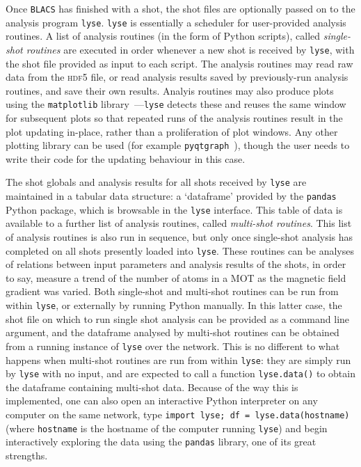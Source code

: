 Once \texttt{BLACS} has finished with a shot, the shot files are optionally passed on to the analysis program \texttt{lyse}. \texttt{lyse} is essentially a scheduler for user-provided analysis routines. A list of analysis routines (in the form of Python scripts), called \emph{single-shot routines} are executed in order whenever a new shot is received by \texttt{lyse}, with the shot file provided as input to each script. The analysis routines may read raw data from the \textsc{hdf5} file, or read analysis results saved by previously-run analysis routines, and save their own results. Analyis routines may also produce plots using the \texttt{matplotlib} library~\cite{Hunter:2007}---\texttt{lyse} detects these and reuses the same window for subsequent plots so that repeated runs of the analysis routines result in the plot updating in-place, rather than a proliferation of plot windows. Any other plotting library can be used (for example \texttt{pyqtgraph}~\cite{campagnola_pyqtgraph_2016}), though the user needs to write their code for the updating behaviour in this case.

The shot globals and analysis results for all shots received by \texttt{lyse} are maintained in a tabular data structure: a `dataframe' provided by the \texttt{pandas}~\cite{mckinney-proc-scipy-2010} Python package, which is browsable in the \texttt{lyse} interface. This table of data is available to a further list of analysis routines, called \emph{multi-shot routines}. This list of analysis routines is also run in sequence, but only once single-shot analysis has completed on all shots presently loaded into \texttt{lyse}. These routines can be analyses of relations between input parameters and analysis results of the shots, in order to say, measure a trend of the number of atoms in a MOT as the magnetic field gradient was varied. Both single-shot and multi-shot routines can be run from within \texttt{lyse}, or externally by running Python manually. In this latter case, the shot file on which to run single shot analysis can be provided as a command line argument, and the dataframe analysed by multi-shot routines can be obtained from a running instance of \texttt{lyse} over the network. This is no different to what happens when multi-shot routines are run from within \texttt{lyse}: they are simply run by \texttt{lyse} with no input, and are expected to call a function \texttt{lyse.data()} to obtain the dataframe containing multi-shot data. Because of the way this is implemented, one can also open an interactive Python interpreter on any computer on the same network, type \texttt{import lyse; df = lyse.data(hostname)} (where \texttt{hostname} is the hostname of the computer running \texttt{lyse}) and begin interactively exploring the data using the \texttt{pandas} library, one of its great strengths.


